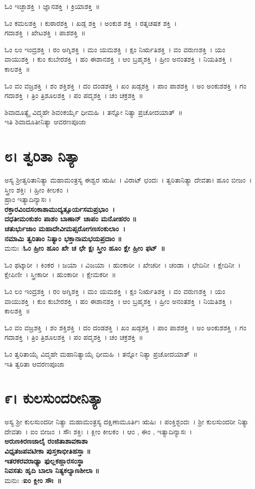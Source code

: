 ಓಂ ಇಚ್ಛಾಶಕ್ತಿ~। ಜ್ಞಾನಶಕ್ತಿ~। ಕ್ರಿಯಾಶಕ್ತಿ~॥ 

ಓಂ ಕಮಲಶಕ್ತಿ~। ಕುಠಾರಶಕ್ತಿ~। ಖಡ್ಗ ಶಕ್ತಿ~। ಅಂಕುಶ ಶಕ್ತಿ~। ರತ್ನಚಷಕ ಶಕ್ತಿ~।\\ಗದಾಶಕ್ತಿ~। ಖೇಟಶಕ್ತಿ~। ಪಾಶಶಕ್ತಿ~॥ 

ಓಂ ಲಂ ಇಂದ್ರಶಕ್ತಿ~। ರಂ ಅಗ್ನಿಶಕ್ತಿ~। ಮಂ ಯಮಶಕ್ತಿ~। ಕ್ಷಂ ನಿರ್ಋತಿಶಕ್ತಿ~। ವಂ ವರುಣಶಕ್ತಿ~। ಯಂ ವಾಯುಶಕ್ತಿ~। ಕುಂ ಕುಬೇರಶಕ್ತಿ~। ಹಂ ಈಶಾನಶಕ್ತಿ~। ಆಂ ಬ್ರಹ್ಮಶಕ್ತಿ~। ಹ್ರೀಂ ಅನಂತಶಕ್ತಿ~। ನಿಯತಿಶಕ್ತಿ~। ಕಾಲಶಕ್ತಿ~॥

ಓಂ ವಂ ವಜ್ರಶಕ್ತಿ~। ಶಂ ಶಕ್ತಿಶಕ್ತಿ~। ದಂ ದಂಡಶಕ್ತಿ~। ಖಂ ಖಡ್ಗಶಕ್ತಿ~। ಪಾಂ ಪಾಶಶಕ್ತಿ~। ಅಂ ಅಂಕುಶಶಕ್ತಿ~। ಗಂ ಗದಾಶಕ್ತಿ~। ತ್ರಿಂ ತ್ರಿಶೂಲಶಕ್ತಿ~। ಪಂ ಪದ್ಮಶಕ್ತಿ~। ಚಂ ಚಕ್ರಶಕ್ತಿ~॥ 

ಶಿವಾದೂತ್ಯೈ ವಿದ್ಮಹೇ ಶಿವಂಕರ್ಯೈ ಧೀಮಹಿ~। ತನ್ನೋ ನಿತ್ಯಾ ಪ್ರಚೋದಯಾತ್~॥\\
ಇತಿ ಶಿವಾದೂತೀನಿತ್ಯಾ ಆವರಣಪೂಜಾ
\section{೮। ತ್ವರಿತಾ ನಿತ್ಯಾ}
ಅಸ್ಯ ಶ್ರೀತ್ವರಿತಾನಿತ್ಯಾ ಮಹಾಮಂತ್ರಸ್ಯ ಈಶ್ವರ ಋಷಿಃ~। ವಿರಾಟ್ ಛಂದಃ~। ತ್ವರಿತಾನಿತ್ಯಾ ದೇವತಾ। ಹೂಂ ಬೀಜಂ~। ಸ್ತ್ರೀಂ ಶಕ್ತಿಃ~। ಹ್ರೀಂ ಕೀಲಕಂ~।\\
ಹ್ರಾಂ ಇತ್ಯಾದಿನ್ಯಾಸಃ ।\\
{\bfseries ರಕ್ತಾರವಿಂದಸಂಕಾಶಾಮುದ್ಯತ್ಸೂರ್ಯಸಮಪ್ರಭಾಂ~।\\
ದಧತೀಮಂಕುಶಂ ಪಾಶಂ ಬಾಣಾನ್ ಚಾಪಂ ಮನೋಹರಂ ॥\\
ಚತುರ್ಭುಜಾಂ ಮಹಾದೇವೀಮಪ್ಸರೋಗಣಸಂಕುಲಾಂ~।\\
ನಮಾಮಿ ತ್ವರಿತಾಂ ನಿತ್ಯಾಂ ಭಕ್ತಾನಾಮಭಯಪ್ರದಾಂ ॥\\}
ಮನುಃ :{\bfseries ಓಂ ಹ್ರೀಂ ಹೂಂ ಖೇ ಚ ಛೇ ಕ್ಷಃ ಸ್ತ್ರೀಂ ಹೂಂ ಕ್ಷೇ ಹ್ರೀಂ ಫಟ್~॥}

ಓಂ ಫಟ್ಕಾರೀ~। ಕಿಂಕರ~। ಜಯಾ~। ವಿಜಯಾ~। ಹುಂಕಾರೀ~। ಖೇಚರೀ~। ಚಂಡಾ~। ಛೇದಿನೀ~। ಕ್ಷೇದಿನೀ~। ಕ್ಷೇಪಿಣೀ~। ಸ್ತ್ರೀಕಾರೀ~। ಹುಂಕಾರೀ~। ಕ್ಷೇಮಕರೀ~॥

ಓಂ ಲಂ ಇಂದ್ರಶಕ್ತಿ~। ರಂ ಅಗ್ನಿಶಕ್ತಿ~। ಮಂ ಯಮಶಕ್ತಿ~। ಕ್ಷಂ ನಿರ್ಋತಿಶಕ್ತಿ~। ವಂ ವರುಣಶಕ್ತಿ~। ಯಂ ವಾಯುಶಕ್ತಿ~। ಕುಂ ಕುಬೇರಶಕ್ತಿ~। ಹಂ ಈಶಾನಶಕ್ತಿ~। ಆಂ ಬ್ರಹ್ಮಶಕ್ತಿ~। ಹ್ರೀಂ ಅನಂತಶಕ್ತಿ~। ನಿಯತಿಶಕ್ತಿ~। ಕಾಲಶಕ್ತಿ~॥ 

ಓಂ ವಂ ವಜ್ರಶಕ್ತಿ~। ಶಂ ಶಕ್ತಿಶಕ್ತಿ~। ದಂ ದಂಡಶಕ್ತಿ~। ಖಂ ಖಡ್ಗಶಕ್ತಿ~। ಪಾಂ ಪಾಶಶಕ್ತಿ~। ಅಂ ಅಂಕುಶಶಕ್ತಿ~। ಗಂ ಗದಾಶಕ್ತಿ~। ತ್ರಿಂ ತ್ರಿಶೂಲಶಕ್ತಿ~। ಪಂ ಪದ್ಮಶಕ್ತಿ~। ಚಂ ಚಕ್ರಶಕ್ತಿ~॥ 

ಓಂ ತ್ವರಿತಾಯೈ ವಿದ್ಮಹೇ ಮಹಾನಿತ್ಯಾಯೈ ಧೀಮಹಿ~। ತನ್ನೋ ನಿತ್ಯಾ ಪ್ರಚೋದಯಾತ್~॥\\
ಇತಿ ತ್ವರಿತಾ ಆವರಣಪೂಜಾ
\section{೯। ಕುಲಸುಂದರೀನಿತ್ಯಾ}
ಅಸ್ಯ ಶ್ರೀ ಕುಲಸುಂದರೀ ನಿತ್ಯಾ ಮಹಾಮಂತ್ರಸ್ಯ ದಕ್ಷಿಣಾಮೂರ್ತಿಃ ಋಷಿಃ~। ಪಂಕ್ತಿಶ್ಛಂದಃ~। ಶ್ರೀ ಕುಲಸುಂದರೀ ನಿತ್ಯಾ ದೇವತಾ~। ಐಂ ಬೀಜಂ~। ಸೌಃ ಶಕ್ತಿಃ~। ಕ್ಲೀಂ ಕೀಲಕಂ~। ಆಂ , ಈಂ , ಇತ್ಯಾದಿನ್ಯಾಸಃ~।\\
{\bfseries ಅರುಣಕಿರಣಜಾಲೈ ರಂಜಿತಾಶಾವಕಾಶಾ\\
ವಿಧೃತಜಪವಟೀಕಾ ಪುಸ್ತಕಾಭೀತಿಹಸ್ತಾ ॥\\
ಇತರಕರವರಾಢ್ಯಾ ಫುಲ್ಲಕಹ್ಲಾರಸಂಸ್ಥಾ\\
ನಿವಸತು ಹೃದಿ ಬಾಲಾ ನಿತ್ಯಕಲ್ಯಾಣಶೀಲಾ ॥\\}
ಮನುಃ :{\bfseries ಐಂ ಕ್ಲೀಂ ಸೌಃ~॥}

